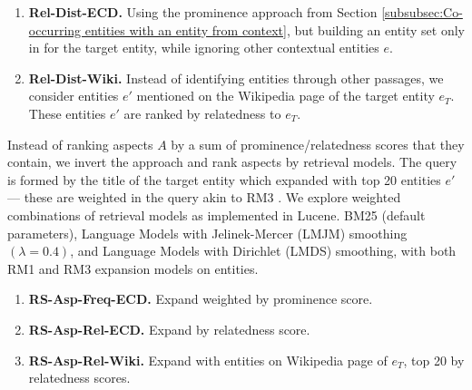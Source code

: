 
\begin{enumerate}
    \item \textbf{Rel-Dist-ECD.} Using the prominence approach from Section \ref{subsubsec:Co-occurring entities with an entity from context}, but building an entity set only in for the target entity, while ignoring other contextual entities $e$.
    \item \textbf{Rel-Dist-Wiki.} Instead of identifying entities through other passages, we consider entities $e'$ mentioned on the Wikipedia page of the target entity $e_T$. These entities $e'$ are ranked by relatedness to $e_T$.
\end{enumerate}

Instead of ranking aspects $A$ by a sum of prominence/relatedness scores that they contain, we invert the approach and rank aspects by retrieval models. The query is formed by the title of the target entity which expanded with top 20 entities $e'$ --- these are weighted in the query akin to RM3 \cite{lavrenko2001relevance}. We explore weighted combinations of retrieval models as implemented in Lucene. BM25 (default parameters), Language Models with Jelinek-Mercer (LMJM) smoothing $(\lambda = 0.4)$, and Language Models with Dirichlet (LMDS) smoothing, with both RM1 and RM3 expansion models on entities.


    
\begin{enumerate}        
    \item \textbf{RS-Asp-Freq-ECD.} Expand weighted by prominence score.
    \item \textbf{RS-Asp-Rel-ECD.} Expand by relatedness score.
    \item \textbf{RS-Asp-Rel-Wiki.} Expand with entities on Wikipedia page of $e_T$, top 20 by relatedness scores.
\end{enumerate}




